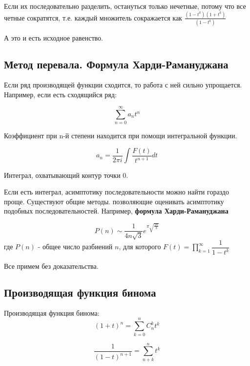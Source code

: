 Если их последовательно разделить, остануться только нечетные, потому что все четные сократятся, т.е. каждый множитель сокражается как $ \frac{(1-t^{k})(1+t^{k})}{(1-t^{k})} $

А это и есть исходное равенство.

\subsection{Метод перевала. Формула Харди-Рамануджана}

Если ряд производящей функции сходится, то работа с ней сильно упрощается.
Например, если есть сходящийся ряд:

$$
\sum\limits_{n = 0}^{\infty} a_n t^n
$$

Коэффициент при n-й степени находится при помощи интегральной функции.

$$
a_n  = \frac{1}{2 \pi i} \int \frac{F(t)}{t^{n+1}} dt
$$

Интеграл, охватывающий контур точки 0.

Если есть интеграл, асимптотику последовательности можно найти гораздо проще.
Существуют общие методы. позволяющие оценивать асимптотику подобных последовательностей.
Например, \textbf{формула Харди-Рамануджана}

$$
P(n) \sim \dfrac{1}{4 n \sqrt{3}} e^{\pi \sqrt{\frac{2n}{3}}}
$$
где $ P(n) $ - общее число разбиений $ n $, для которого 
$ F(t) = \prod\limits_{k = 1}^{\infty} \dfrac{1}{1 - t^{k}} $

Все примем без доказательства.


\subsection{Производящая функция бинома}

Производящая функция бинома:
$$
(1+t)^n = \sum_{k=0}^n C_n^k t^k 
$$

$$
\frac{1}{(1-t)^{n+1}} = \sum\limits_{n+k}^{n} t^k 
$$
